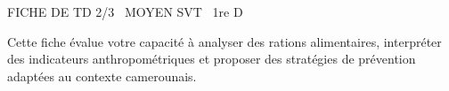 \documentclass[11pt]{article}
\begin{document}
\begin{tcolorbox}[enhanced,colback=popink,colframe=popink,arc=10pt,boxrule=0pt,left=12pt,right=12pt,top=9pt,bottom=9pt]
{\color{white}\popxbold\small FICHE DE TD 2/3 \textbullet\ MOYEN \hfill SVT \textbullet\ 1re D\par}
\end{tcolorbox}
\vspace{4pt}
\noindent Cette fiche évalue votre capacité à analyser des rations alimentaires, interpréter des indicateurs anthropométriques et proposer des stratégies de prévention adaptées au contexte camerounais.
\end{document}
